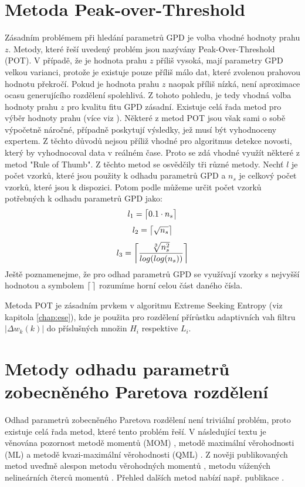 \section{Metoda Peak-over-Threshold}
Zásadním problémem při hledání parametrů GPD je volba vhodné hodnoty prahu $z$. Metody, které řeší uvedený problém jsou nazývány Peak-Over-Threshold (POT). V případě, že je hodnota prahu $z$ příliš vysoká, mají parametry GPD velkou varianci, protože je existuje pouze příliš málo dat, které zvolenou prahovou hodnotu překročí. Pokud je hodnota prahu $z$ naopak příliš nízká, není aproximace ocasu generujícího rozdělení spolehlivá.  Z tohoto pohledu, je tedy vhodná volba hodnoty prahu $z$ pro kvalitu fitu GPD zásadní. Existuje celá řada metod pro výběr hodnoty prahu (více viz \cite{scarrott2012review}). Některé z metod POT jsou však sami o sobě výpočetně náročné, případně poskytují výsledky, jež musí být vyhodnoceny expertem. Z těchto důvodů nejsou příliž vhodné pro algoritmus detekce novosti, který by vyhodnocoval data v reálném čase. Proto se zdá vhodné využít některé z metod "Rule of Thumb". Z těchto metod se osvědčily tři různé metody. Nechť $l$ je počet vzorků, které jsou použity k odhadu parametrů GPD a $n_s$ je celkový počet vzorků, které jsou k dispozici. Potom podle \cite{DuMouchel,ferreira2003optimising,loretan1994testing} můžeme určit počet vzorků potřebných k odhadu parametrů GPD jako:
\begin{equation} \label{eq:l1}
    l_1=\ceil[\big]{0.1 \cdot n_s}
\end{equation}
\begin{equation} \label{eq:l2}
    l_2=\ceil[\big]{\sqrt{n_s}}
\end{equation}
\begin{equation} \label{eq:l3}
     l_3=\ceil[\bigg]{\frac{\sqrt[3]{n_s^{2}}}{log(log(n_s))}}
\end{equation}
Ještě poznamenejme, že pro odhad parametrů GPD se využívají vzorky s nejvyšší  hodnotou a symbolem $\ceil{\, }$ rozumíme horní celou část daného čísla.
\par
Metoda POT je zásadním prvkem v algoritmu Extreme Seeking Entropy (viz kapitola \ref{chap:ese}), kde je použita pro rozdělení přírůstku adaptivních vah filtru $|\Delta w_k(k)|$ do příslušných množin $H_i$ respektive $L_i$.


\section{Metody odhadu parametrů zobecněného Paretova rozdělení}
Odhad parametrů zobecněného Paretova rozdělení není triviální problém, proto existuje celá řada metod, které tento problém řeší. V následující textu je věnována pozornost metodě momentů (MOM) \cite{mom_orig}, metodě maximální věrohodnosti (ML) \cite{DuMouchel} a metodě kvazi-maximální věrohodnosti (QML) \cite{Luceno}. Z nověji publikovaných metod uveďmě alespon metodu věrohodných momentů \cite{zhang1}, metodu vážených nelineárních čterců momentů \cite{zhao1,park}. Přehled dalších metod nabízí např. publikace \cite{gpd_est}.
